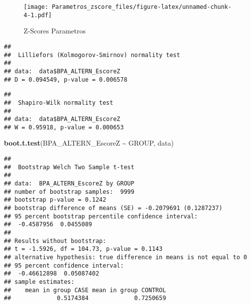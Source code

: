 \documentclass[
]{article}
\newenvironment{Shaded}{\begin{snugshade}}{\end{snugshade}}
\newcommand{\FunctionTok}[1]{\textcolor[rgb]{0.13,0.29,0.53}{\textbf{#1}}}
\newcommand{\NormalTok}[1]{#1}
\newcommand{\SpecialCharTok}[1]{\textcolor[rgb]{0.81,0.36,0.00}{\textbf{#1}}}
\begin{document}
\begin{figure}
\centering
\texttt{[image: Parametros\_zscore\_files/figure-latex/unnamed-chunk-4-1.pdf]}
\caption{Z-Scores Parametros}
\end{figure}

\begin{Shaded}
\end{Shaded}

\begin{verbatim}
## 
##  Lilliefors (Kolmogorov-Smirnov) normality test
## 
## data:  data$BPA_ALTERN_EscoreZ
## D = 0.094549, p-value = 0.006578
\end{verbatim}

\begin{Shaded}
\end{Shaded}

\begin{verbatim}
## 
##  Shapiro-Wilk normality test
## 
## data:  data$BPA_ALTERN_EscoreZ
## W = 0.95918, p-value = 0.000653
\end{verbatim}

\begin{Shaded}
\begin{Highlighting}[]
\FunctionTok{boot.t.test}\NormalTok{(BPA\_ALTERN\_EscoreZ }\SpecialCharTok{\textasciitilde{}}\NormalTok{ GROUP, data)}
\end{Highlighting}
\end{Shaded}

\begin{verbatim}
## 
##  Bootstrap Welch Two Sample t-test
## 
## data:  BPA_ALTERN_EscoreZ by GROUP
## number of bootstrap samples:  9999
## bootstrap p-value = 0.1242 
## bootstrap difference of means (SE) = -0.2079691 (0.1287237) 
## 95 percent bootstrap percentile confidence interval:
##  -0.4587956  0.0455089
## 
## Results without bootstrap:
## t = -1.5926, df = 104.73, p-value = 0.1143
## alternative hypothesis: true difference in means is not equal to 0
## 95 percent confidence interval:
##  -0.46612898  0.05087402
## sample estimates:
##    mean in group CASE mean in group CONTROL 
##             0.5174384             0.7250659
\end{verbatim}
\end{document}
